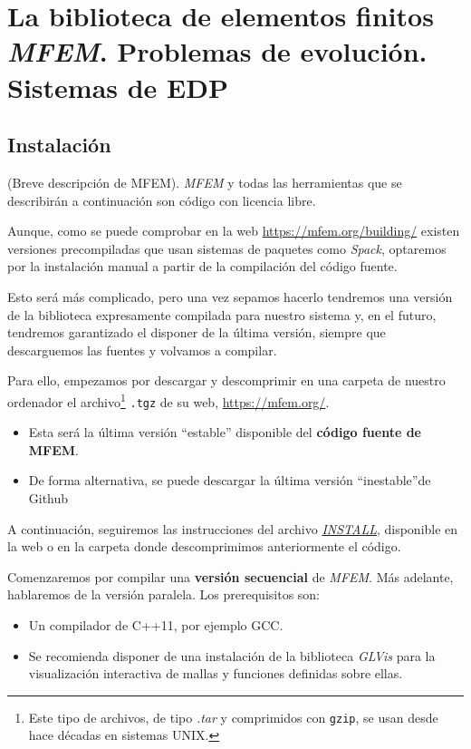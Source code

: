 \newcommand{\mfem}{\textit{MFEM}\xspace}
\newcommand{\glvis}{\textit{GLVis}\xspace}

\section{La biblioteca de elementos finitos \mfem. Problemas de evolución. Sistemas de EDP}
\subsection{Instalación}
\label{sec:03:instalacion}

(Breve descripción de MFEM).
\mfem y todas las herramientas que se describirán a continuación son código con licencia libre.

Aunque, como se puede comprobar en la web
\url{https://mfem.org/building/} existen versiones precompiladas que
usan sistemas de paquetes como \textit{Spack}, optaremos por la
instalación manual a partir de la compilación del código fuente.

Esto será más complicado, pero una vez sepamos hacerlo tendremos una
versión de la biblioteca expresamente compilada para nuestro sistema
y, en el futuro, tendremos garantizado el disponer de la última
versión, siempre que descarguemos las fuentes y volvamos a compilar.

Para ello, empezamos por descargar y descomprimir en una carpeta de
nuestro ordenador el archivo\footnote{Este tipo de archivos, de tipo
  \textit{.tar} y comprimidos con \texttt{gzip}, se usan desde hace
  décadas en sistemas UNIX.}  \texttt{.tgz} de su web,
\url{https://mfem.org/}.
\begin{itemize}
\item Esta será la última versión ``estable'' disponible del \textbf{código fuente de MFEM}.
\item De forma alternativa, se puede descargar la última versión ``inestable''de Github
\end{itemize}


A continuación, seguiremos las instrucciones del archivo
\href{https://raw.githubusercontent.com/mfem/mfem/master/INSTALL}{\textit{INSTALL}},
disponible en la web o en la carpeta donde descomprimimos anteriormente el código.

Comenzaremos por compilar una \textbf{versión secuencial} de \mfem. Más
adelante, hablaremos de la versión paralela. Los prerequisitos son:
\begin{itemize}
\item Un compilador de C++11, por ejemplo GCC.
\item Se recomienda disponer de una instalación de la biblioteca
  \textit{\glvis} para la visualización interactiva de mallas y
  funciones definidas sobre ellas.
\end{itemize}

